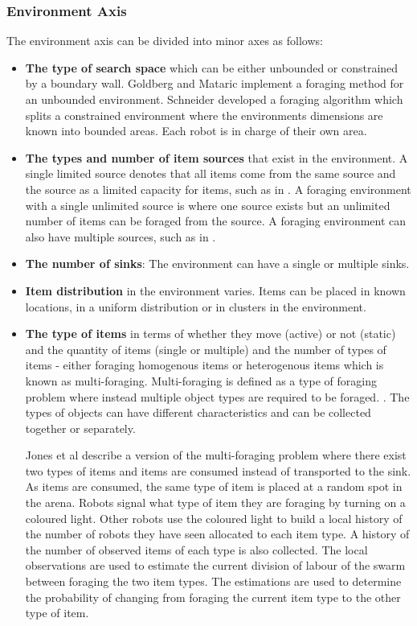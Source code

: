 \subsubsection{Environment Axis}
\label{environmentaxis}
The environment axis can be divided into minor axes as follows:
\begin{itemize}
\item \textbf{The type of search space} which can be either unbounded or constrained by a boundary wall. Goldberg and Mataric \cite{Goldberg01designand} implement a foraging method for an unbounded environment. Schneider \cite{schneider1998territorial} developed a foraging algorithm which splits a constrained environment where the environments dimensions are known into bounded areas. Each robot is in charge of their own area.

\item \textbf{The types and number of item sources} that exist in the environment. A single limited source denotes that all items come from the same source and the source as a limited capacity for items, such as in \cite{sugawara2002swarming}. A foraging environment with a single unlimited source is where one source exists but an unlimited number of items can be foraged from the source. A foraging environment can also have multiple sources, such as in \cite{Goldberg01designand}. 

\item \textbf{The number of sinks}: The environment can have a single or multiple sinks. 

\item \textbf{Item distribution} in the environment varies. Items can be placed in known locations, in a uniform distribution or in clusters in the environment.

\item \textbf{The type of items} in terms of whether they move (active) or not (static) and the quantity of items (single or multiple) and the number of types of items - either foraging homogenous items or heterogenous items which is known as multi-foraging. Multi-foraging is defined as a type of foraging problem where instead multiple object types are required to be foraged. \cite{Balch99rewardand}. The types of objects can have different characteristics and can be collected together or separately.

Jones et al \cite{jones2003adaptive} describe a version of the multi-foraging problem where there exist two types of items and items are consumed instead of transported to the sink. As items are consumed, the same type of item is placed at a random spot in the arena. Robots signal what type of item they are foraging by turning on a coloured light. Other robots use the coloured light to build a local history of the number of robots they have seen allocated to each item type. A history of the number of observed items of each type is also collected. The local observations are used to estimate the current division of labour of the swarm between foraging the two item types. The estimations are used to determine the probability of changing from foraging the current item type to the other type of item. 


\end{itemize}
